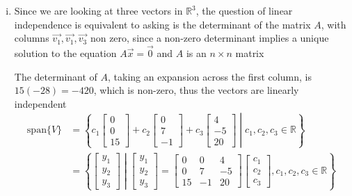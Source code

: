 \documentclass{article}
\begin{document}
\begin{enumerate}[(i)]
    The addition of the third vector does not change the spanning set, since it will still be able to each all points 
    in \(\mathbb{R}^2\), it won't change where we can reach
    \\

    Since the three vectors are not linearly independent by definition they 
    cannot form a basis of \(\mathbb{R}^2\)

    \item Since we are looking at three vectors in \(\mathbb{R}^3\), the question of linear
    independence is equivalent to asking is the determinant of the matrix \(A\), with columns \(\vec{v_1}, \vec{v_1},
    \vec{v_3}\) non zero, since a non-zero determinant implies a unique solution to the 
    equation \(A\vec{x} = \vec{0}\) and \(A\) is an \(n\times n\) matrix

    The determinant of \(A\), taking an expansion across the first column, is \(15(-28) = -420\), which
    is non-zero, thus the vectors are linearly independent
    \\

    \begin{align*}
        \text{span}\{{V}\} &= \left\{c_1\begin{bmatrix}
        0\\0\\15
        \end{bmatrix} + c_2\begin{bmatrix}
        0\\7\\-1
        \end{bmatrix} + c_3\begin{bmatrix}
        4\\-5\\20
        \end{bmatrix} \middle| c_1,c_2,c_3 \in \mathbb{R}\right\}
        \\
        & = \left\{\begin{bmatrix}
        y_1\\y_2\\y_3
        \end{bmatrix} \middle| \begin{bmatrix}
        y_1\\y_2\\y_3
        \end{bmatrix} = \begin{bmatrix}
        0&0&4\\0&7&-5 \\ 15&-1&20
        \end{bmatrix}\begin{bmatrix}
        c_1\\c_2\\c_3
        \end{bmatrix}, c_1,c_2,c_3 \in \mathbb{R}\right\}
    \end{align*}


\end{enumerate}
\end{document}
